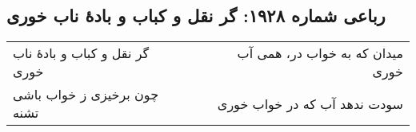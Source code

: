 \begin{center}
\section*{رباعی شماره ۱۹۲۸: گر نقل و کباب و بادهٔ ناب خوری}
\label{sec:1928}
\begin{longtable}{l p{0.5cm} r}
گر نقل و کباب و بادهٔ ناب خوری
&&
میدان که به خواب در، همی آب خوری
\\
چون برخیزی ز خواب باشی تشنه
&&
سودت ندهد آب که در خواب خوری
\\
\end{longtable}
\end{center}
